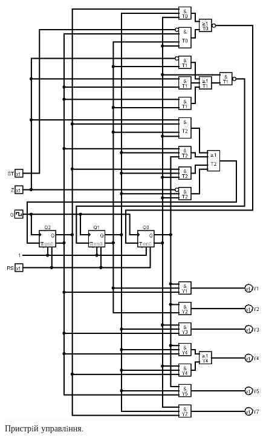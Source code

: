 \documentclass[a4paper, 10pt]{article}
\begin{document}
\begin{figure}[H]
\begin{center}
\includegraphics[scale=0.5]{cu.png}
\caption{Пристрiй управлiння.}
\end{center}
\end{figure}
\end{document}
